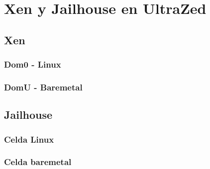\chapter{Xen y Jailhouse en UltraZed}

\section{Xen}
\subsection{Dom0 - Linux}

\subsection{DomU - Baremetal}

\section{Jailhouse}
\subsection{Celda Linux}

\subsection{Celda baremetal}
